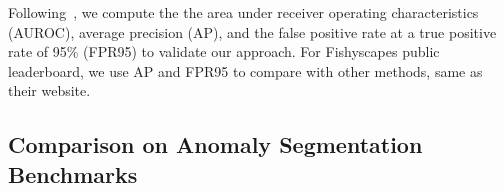 \documentclass[runningheads]{llncs}
\begin{document}
Following~\cite{jung2021standardized,blum2019fishyscapes,di2021pixel,chan2021entropy}, we compute the the area under receiver operating characteristics (AUROC), average precision (AP), and the false positive rate at a true positive rate of 95\% (FPR95) to validate our approach. 
For Fishyscapes public leaderboard, we use AP and FPR95 to compare with other methods, same as their website.




\vspace{-10pt}
\subsection{Comparison on Anomaly Segmentation Benchmarks}



\begin{table}[t!]
\centering
\caption{Anomaly segmentation results on \textbf{LostAndFound} testing set, with \textbf{WideResnet38} backbone. All methods use the same segmentation models. * indicate that the model requires additional learnable parameters.  indicates that the results are obtained from the official code with our WideResnet38 backbone. 
}
\label{tab:lost_found_test}
\vspace{-10pt}
\end{table}
\end{document}
